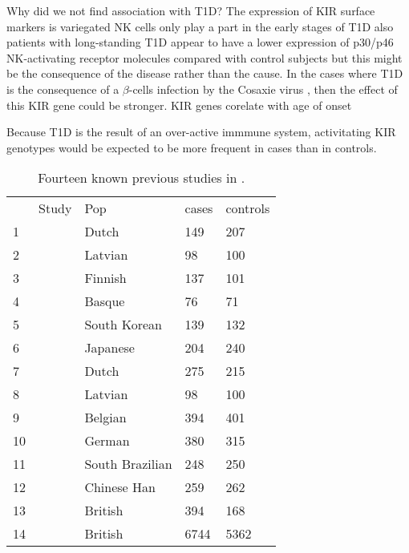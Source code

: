 Why did we not find association with T1D?
The expression of KIR surface markers is variegated \citep{Pascal:2007wf,Li:2008ea}
NK cells only play a part in the early stages of T1D
also patients with long-standing T1D appear to have a lower expression of p30/p46 NK-activating receptor molecules compared with control subjects \citep{Rodacki:2007ht}
but this might be the consequence of the disease rather than the cause.
In the cases where T1D is the consequence of a $\beta$-cells infection by the Cosaxie virus \citep{Rodacki:2007ht}, then the effect of this KIR gene could be stronger.
KIR genes corelate with age of onset \citep{Mehers:2011fj}

Because T1D is the result of an over-active immmune system, activitating KIR genotypes would be expected to be more frequent in cases than in controls.





\begin{table}[h]
\begin{tabularx}{\textwidth}{lllll}
\rowcolor{Gray}
   & Study                       & Pop             & cases & controls \\
1  & \citet{vanderSlik:2003gq}   & Dutch           & 149  & 207 \\
2  & \citet{NikitinaZake:2004jv} & Latvian         & 98   & 100 \\
3  & \citet{Middleton:2006ba}    & Finnish         & 137  & 101 \\
4  & \citet{Santin:2006hh}       & Basque          & 76   & 71 \\
5  & \citet{PARK:2006km}         & South Korean    & 139  & 132 \\
6  & \citet{Mogami:2007gj}       & Japanese        & 204  & 240 \\
7  & \citet{vanderSlik:2007hi}   & Dutch           & 275  & 215 \\
8  & \citet{Shastry:2008id}      & Latvian         & 98   & 100 \\
9  & \citet{RamosLopez:2009jf}   & Belgian         & 394  & 401 \\
10 & \citet{RamosLopez:2009jf}   & German          & 380  & 315 \\
11 & \citet{Jobim:2010}          & South Brazilian & 248  & 250 \\
12 & \citet{Zhi:2011kl}          & Chinese Han     & 259  & 262 \\
13 & \citet{Mehers:2011fj}       & British         & 394  & 168 \\
14 & \citet{Pontikos:2014ho}     & British         & 6744 & 5362 \\
\end{tabularx}
\caption{
  \label{table:kir-t1d-studies}
  Fourteen known previous  studies in .
}
\end{table}





